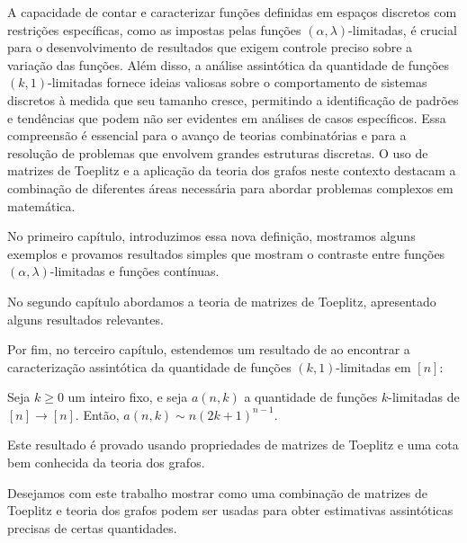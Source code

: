 A capacidade de contar e caracterizar funções definidas em espaços discretos com restrições específicas, como as impostas pelas funções $(\alpha,\lambda)$-limitadas, é crucial para o desenvolvimento de resultados que exigem controle preciso sobre a variação das funções. Além disso, a análise assintótica da quantidade de funções $(k,1)$-limitadas fornece ideias valiosas sobre o comportamento de sistemas discretos à medida que seu tamanho cresce, permitindo a identificação de padrões e tendências que podem não ser evidentes em análises de casos específicos. Essa compreensão é essencial para o avanço de teorias combinatórias e para a resolução de problemas que envolvem grandes estruturas discretas. O uso de matrizes de Toeplitz e a aplicação da teoria dos grafos neste contexto destacam a combinação de diferentes áreas necessária para abordar problemas complexos em matemática.

No primeiro capítulo, introduzimos essa nova definição, mostramos alguns exemplos e provamos resultados simples que mostram o contraste entre funções $(\alpha,\lambda)$-limitadas e funções contínuas.

No segundo capítulo abordamos a teoria de matrizes de Toeplitz, apresentado alguns resultados relevantes.

Por fim, no terceiro capítulo, estendemos um resultado de \cite{coulson} ao encontrar a caracterização assintótica da quantidade de funções $(k,1)$-limitadas em $[n]$:

\begin{theorem*} Seja $k \ge 0$ um inteiro fixo, e seja $a(n, k)$ a quantidade de funções $k$-limitadas de $[n]\to[n]$. Então, $a(n,k) \sim n(2k+1)^{n-1}$. \end{theorem*}

Este resultado é provado usando propriedades de matrizes de Toeplitz e uma cota bem conhecida da teoria dos grafos.

Desejamos com este trabalho mostrar como uma combinação de matrizes de Toeplitz e teoria dos grafos podem ser usadas para obter estimativas assintóticas precisas de certas quantidades.
